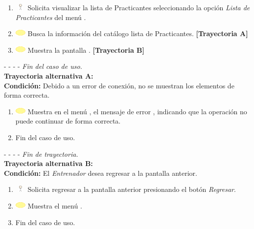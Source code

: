 \begin{enumerate}
	\item \includegraphics[width=15pt, height=10pt]{./Figuras/iconosCU/usuario.png} Solicita visualizar la lista de Practicantes seleccionando la opción \textit{Lista de Practicantes} del menú . 
	\item \includegraphics[width=15pt]{./Figuras/iconosCU/herramienta.png} Busca la información del catálogo lista de Practicantes. \textbf{[Trayectoria A]}
	\item \includegraphics[width=15pt]{./Figuras/iconosCU/herramienta.png} Muestra la pantalla . \textbf{[Trayectoria B]}
\end{enumerate}
	
- - - - \textit{Fin del caso de uso.} \\

\textbf{\large{Trayectoria alternativa A:}}\\
\textbf{Condición: } Debido a un error de conexión, no se muestran los elementos de forma correcta.

\begin{enumerate}
	\item \includegraphics[width=15pt]{./Figuras/iconosCU/herramienta.png} Muestra en el menú , el mensaje de error , indicando que la operación no puede continuar de forma correcta.
	\item Fin del caso de uso.
\end{enumerate}

- - - - \textit{Fin de trayectoria.} \\

\textbf{\large{Trayectoria alternativa B:}}\\
\textbf{Condición: } El \textit{Entrenador} desea regresar a la pantalla anterior.

\begin{enumerate}
	\item \includegraphics[width=15pt, height=10pt]{./Figuras/iconosCU/usuario.png} Solicita regresar a la pantalla anterior presionando el botón \textit{Regresar}.
	\item \includegraphics[width=15pt]{./Figuras/iconosCU/herramienta.png} Muestra el menú .
	\item Fin del caso de uso.
\end{enumerate}

